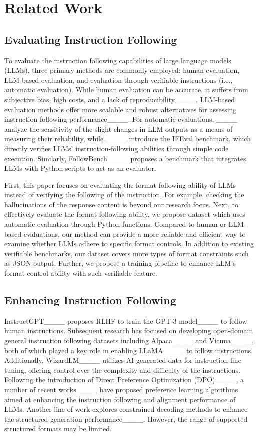 \section{Related Work}
\subsection{Evaluating Instruction Following} 

To evaluate the instruction following capabilities of large language models (LLMs), three primary methods are commonly employed: human evaluation, LLM-based evaluation, and evaluation through verifiable instructions (i.e., automatic evaluation). While human evaluation can be accurate, it suffers from subjective bias, high costs, and a lack of reproducibility____. 
LLM-based evaluation methods offer more scalable and robust alternatives for assessing instruction following performance____. 
For automatic evaluations, ____ analyze the sensitivity of the slight changes in LLM outputs as a means of measuring their reliability, while ____ introduce the IFEval benchmark, which directly verifies LLMs' instruction-following abilities through simple code execution. Similarly, FollowBench____ proposes a benchmark that integrates LLMs with Python scripts to act as an evaluator.


First, this paper focuses on evaluating the format following ability of LLMs instead of verifying the following of the instruction. For example, checking the hallucinations of the response content is beyond our research focus.
Next, to effectively evaluate the format following ability, we propose \dataset dataset which uses automatic evaluation through Python functions.
Compared to human or LLM-based evaluations, our method can provide a more reliable and efficient way to examine whether LLMs adhere to specific format controls.
In addition to existing verifiable benchmarks, our dataset covers more types of format constraints such as JSON output. Further, we propose a training pipeline to enhance LLM's format control ability with such verifiable feature. 

\subsection{Enhancing Instruction Following}
InstructGPT____  proposes RLHF to train the GPT-3 model____ to follow human instructions.
Subsequent research has focused on developing open-domain general instruction following datasets including Alpaca____ and Vicuna____, both of which played a key role in enabling LLaMA____ to follow instructions.
Additionally, WizardLM____ utilizes AI-generated data for instruction fine-tuning, offering control over the complexity and difficulty of the instructions.
Following the introduction of Direct Preference Optimization (DPO)____, a number of recent works____ have proposed preference learning algorithms aimed at enhancing the instruction following and alignment performance of LLMs.
Another line of work explores constrained decoding methods to enhance the structured generation performance____. However, the range of supported structured formats may be limited.

